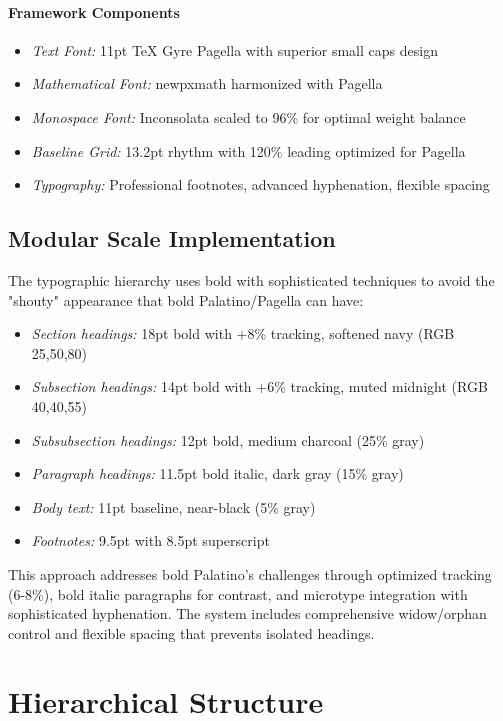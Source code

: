 \documentclass[11pt]{article}
\begin{document}
\paragraph{Framework Components}
\begin{itemize}
\item \emph{Text Font:} 11pt TeX Gyre Pagella with superior small caps design  
\item \emph{Mathematical Font:} newpxmath harmonized with Pagella
\item \emph{Monospace Font:} Inconsolata scaled to 96\% for optimal weight balance
\item \emph{Baseline Grid:} 13.2pt rhythm with 120\% leading optimized for Pagella
\item \emph{Typography:} Professional footnotes, advanced hyphenation, flexible spacing
\end{itemize}

\subsection{Modular Scale Implementation}

The typographic hierarchy uses bold with sophisticated techniques to avoid the "shouty" appearance that bold Palatino/Pagella can have:

\begin{itemize}
\item \emph{Section headings:} 18pt bold with +8\% tracking, softened navy (RGB 25,50,80)
\item \emph{Subsection headings:} 14pt bold with +6\% tracking, muted midnight (RGB 40,40,55)
\item \emph{Subsubsection headings:} 12pt bold, medium charcoal (25\% gray)
\item \emph{Paragraph headings:} 11.5pt bold italic, dark gray (15\% gray)
\item \emph{Body text:} 11pt baseline, near-black (5\% gray)
\item \emph{Footnotes:} 9.5pt with 8.5pt superscript
\end{itemize}

This approach addresses bold Palatino's challenges through optimized tracking (6-8\%), bold italic paragraphs for contrast, and microtype integration with sophisticated hyphenation. The system includes comprehensive widow/orphan control and flexible spacing that prevents isolated headings.

\section{Hierarchical Structure}
\end{document}
